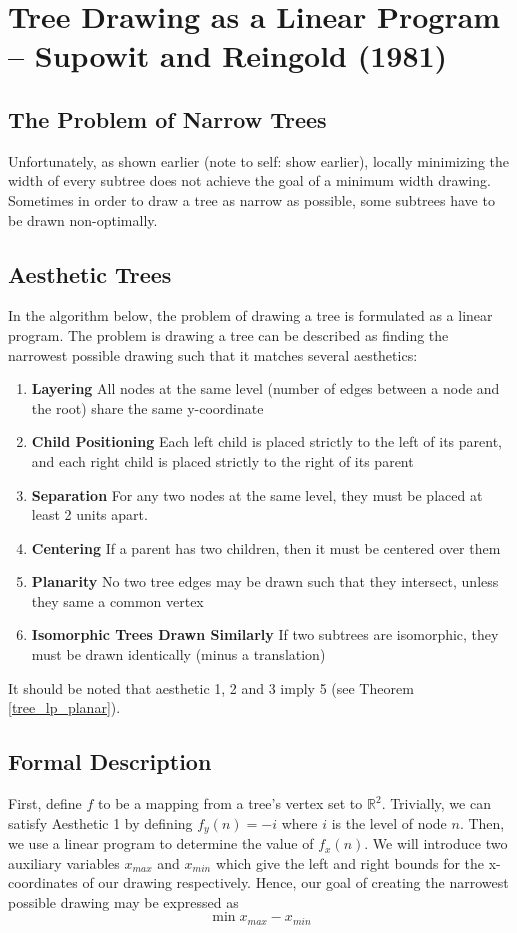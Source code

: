 \documentclass[11pt]{report}
\begin{document}
\section{Tree Drawing as a Linear Program -- Supowit and Reingold (1981)}
\subsection{The Problem of Narrow Trees}
Unfortunately, as shown earlier (note to self: show earlier), locally minimizing the width of every subtree does not achieve the goal of a minimum width drawing. Sometimes in order to draw a tree as narrow as possible, some subtrees have to be drawn non-optimally.

\subsection{Aesthetic Trees}

In the algorithm below, the problem of drawing a tree is formulated as a linear program. The problem is drawing a tree can be described as finding the narrowest possible drawing such that it matches several aesthetics:
\begin{enumerate}
    \item \textbf{Layering} All nodes at the same level (number of edges between a node and the root) share the same y-coordinate
    \item \textbf{Child Positioning} Each left child is placed strictly to the left of its parent, and each right child is placed strictly to the right of its parent
    \item \textbf{Separation} For any two nodes at the same level, they must be placed at least 2 units apart.
    \item \textbf{Centering} If a parent has two children, then it must be centered over them
    \item \textbf{Planarity} No two tree edges may be drawn such that they intersect, unless they same a common vertex
    \item \textbf{Isomorphic Trees Drawn Similarly} If two subtrees are isomorphic, they must be drawn identically (minus a translation)
\end{enumerate}

It should be noted that aesthetic 1, 2 and 3 imply 5 (see Theorem \ref{tree_lp_planar}).

\subsection{Formal Description}
First, define $f$ to be a mapping from a tree's vertex set to $\mathbb{R}^2$. Trivially, we can satisfy Aesthetic 1 by defining $f_y(n) = -i$ where $i$ is the level of node $n$. Then, we use a linear program to determine the value of $f_x(n)$. We will introduce two auxiliary variables $x_{max}$ and $x_{min}$ which give the left and right bounds for the x-coordinates of our drawing respectively. Hence, our goal of creating the narrowest possible drawing may be expressed as 
\[
\min{x_{max} - x_{min}}
\]
\end{document}
